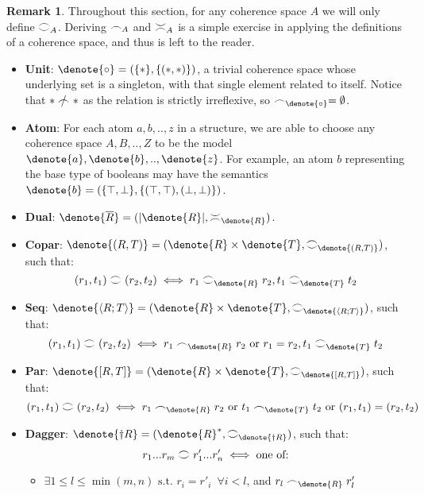\documentclass[11pt, oneside]{article}
\theoremstyle{plain}
\theoremstyle{definition}
\newtheorem*{remark}{Remark}
\let\originaldagger\dagger
\renewcommand{\dag}{\mathord{\originaldagger}}
\DeclarePairedDelimiter\denote\llbracket\rrbracket
\newcommand{\la}{\langle}
\newcommand{\ra}{\rangle}
\newcommand{\coh}[1][]{\mathrel{\vcenter{\offinterlineskip\hbox{$\frown$}\vskip0.2ex\hbox{$\smile$}}_{\ifx\\#1\\\else#1\fi}}}
\newcommand{\incoh}[1][]{\mathrel{\vcenter{\offinterlineskip\hbox{$\smile$}\vskip0.2ex\hbox{$\frown$}}_{\ifx\\#1\\\else#1\fi}}}
\newcommand{\scoh}[1][]{\mathrel{\frown}_{\ifx\\#1\\\else#1\fi}}
\newcommand{\notscoh}[1][]{\mathrel{\ooalign{$\frown$\cr\hidewidth$/$\hidewidth}}_{\ifx\\#1\\\else#1\fi}}
\newcommand{\unit}{\circ}
\begin{document}
\begin{remark}
    Throughout this section, for any coherence space $A$ we will only define $\coh[A]$.
    Deriving $\scoh[A]$ and $\incoh[A]$ is a simple exercise in applying the definitions of a coherence space, and thus is left to the reader.
\end{remark}

\begin{itemize}

\item
\textbf{Unit}: $\denote{\unit} = (\{*\},\{(*,*)\})$, a trivial coherence space whose underlying set is a singleton, with that single element related to itself.
Notice that $* \notscoh[] *$ as the relation is strictly irreflexive, so $\scoh[\denote{\unit}]=\emptyset$.

\item
\textbf{Atom}: For each atom $a,b,..,z$ in a structure, we are able to choose any coherence space $A,B,..,Z$ to be the model $\denote{a},\denote{b},..,\denote{z}$.
For example, an atom $b$ representing the base type of booleans may have the semantics $\denote{b} = (\{\top,\bot\},\{(\top,\top),(\bot,\bot)\})$.

\item
\textbf{Dual}: $\denote{\overline{R}}=(|\denote{R}|,\incoh[\denote{R}])$.

\item
\textbf{Copar}: $\denote{(R,T)} = (\denote{R}\times\denote{T},\coh[\denote{(R,T)}])$,
such that:
$$(r_1,t_1)\coh(r_2,t_2)\iff r_1\coh[\denote{R}]r_2, t_1\coh[\denote{T}]t_2$$

\item
\textbf{Seq}: $\denote{\la R;T\ra} = (\denote{R}\times\denote{T},\coh[\denote{\la R;T\ra}])$, such that:
$$(r_1,t_1)\coh(r_2,t_2) \iff r_1\scoh[\denote{R}]r_2 \text{ or } r_1 = r_2, t_1\coh[\denote{T}]t_2$$

\item
\textbf{Par}: $\denote{[R,T]} = (\denote{R}\times\denote{T},\coh[\denote{[R,T]}])$, such that:
$$(r_1,t_1)\coh(r_2,t_2) \iff r_1\scoh[\denote{R}]r_2 \text{ or } t_1\scoh[\denote{T}]t_2 \text{ or } (r_1,t_1)=(r_2,t_2)$$

\item
\textbf{Dagger}: $\denote{\dag R} = (\denote{R}^*, \coh[\denote{\dag R}])$, such that:
$$r_1...r_m \coh r'_1...r'_n \iff \text{one of:}$$

\begin{itemize}
    \item
    $\exists 1\leq l \leq \min(m,n) \text{ s.t. } r_i=r'_i \enspace\forall i<l$, and $r_l \scoh[\denote{R}] r'_l$


\end{itemize}
\end{itemize}
\end{document}

